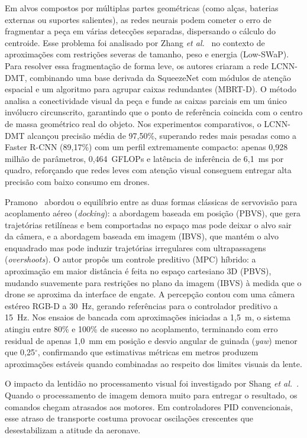 Em alvos compostos por múltiplas partes geométricas (como alças, baterias externas ou suportes salientes), as redes neurais podem cometer o erro de fragmentar a peça em várias detecções separadas, dispersando o cálculo do centroide. Esse problema foi analisado por Zhang \textit{et al.}~\cite{remotesensing2024} no contexto de aproximações com restrições severas de tamanho, peso e energia (Low-SWaP). Para resolver essa fragmentação de forma leve, os autores criaram a rede LCNN-DMT, combinando uma base derivada da SqueezeNet com módulos de atenção espacial e um algoritmo para agrupar caixas redundantes (MBRT-D). O método analisa a conectividade visual da peça e funde as caixas parciais em um único invólucro circunscrito, garantindo que o ponto de referência coincida com o centro de massa geométrico real do objeto. Nos experimentos comparativos, o LCNN-DMT alcançou precisão média de 97,50\%, superando redes mais pesadas como a Faster R-CNN (89,17\%) com um perfil extremamente compacto: apenas 0,928 milhão de parâmetros, 0,464~GFLOPs e latência de inferência de 6,1~ms por quadro, reforçando que redes leves com atenção visual conseguem entregar alta precisão com baixo consumo em drones.


Pramono~\cite{pramono2025} abordou o equilíbrio entre as duas formas clássicas de servovisão para acoplamento aéreo (\textit{docking}): a abordagem baseada em posição (PBVS), que gera trajetórias retilíneas e bem comportadas no espaço mas pode deixar o alvo sair da câmera, e a abordagem baseada em imagem (IBVS), que mantém o alvo enquadrado mas pode induzir trajetórias irregulares com ultrapassagens (\textit{overshoots}). O autor propôs um controle preditivo (MPC) híbrido: a aproximação em maior distância é feita no espaço cartesiano 3D (PBVS), mudando suavemente para restrições no plano da imagem (IBVS) à medida que o drone se aproxima da interface de engate. A percepção contou com uma câmera estéreo RGB-D a 30~Hz, gerando referências para o controlador preditivo a 15~Hz. Nos ensaios de bancada com aproximações iniciadas a 1,5~m, o sistema atingiu entre 80\% e 100\% de sucesso no acoplamento, terminando com erro residual de apenas 1,0~mm em posição e desvio angular de guinada (\textit{yaw}) menor que 0,25$^\circ$, confirmando que estimativas métricas em metros produzem aproximações estáveis quando combinadas ao respeito dos limites visuais da lente.

O impacto da lentidão no processamento visual foi investigado por Shang \textit{et al.}~\cite{shang2016}. Quando o processamento de imagem demora muito para entregar o resultado, os comandos chegam atrasados aos motores. Em controladores PID convencionais, esse atraso de transporte costuma provocar oscilações crescentes que desestabilizam a atitude da aeronave.

